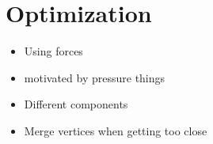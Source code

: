 \section{Optimization}
\label{sect:implementation-optimization}

\begin{itemize}
	\item Using forces
	\item motivated by pressure things
	\item Different components
	\item Merge vertices when getting too close
\end{itemize}
